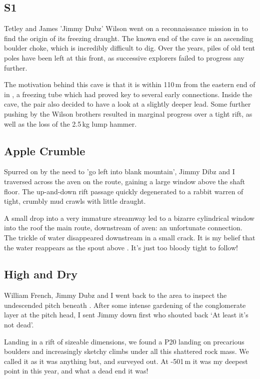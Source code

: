 
\subsection{S1} Tetley and James 'Jimmy Dubz' Wilson went on a reconnaissance mission in  to find the origin of its freezing draught. The known end of the cave is an ascending boulder choke, which is incredibly difficult to dig. Over the years, piles of old tent poles have been left at this front, as successive explorers failed to progress any further. 

The motivation behind this cave is that it is within 110\,m from the eastern end of  in , a freezing tube which had proved key to several early connections. Inside the cave, the pair also decided to have a look at a slightly deeper lead. Some further pushing by the Wilson brothers resulted in marginal progress over a tight rift, as well as the loss of the 2.5\,kg lump hammer. 

\subsection{Apple Crumble} Spurred on by the need to 'go left into blank mountain', Jimmy Dibz and I  traversed across the  aven on the  route, gaining a large window above the shaft floor. The up-and-down rift passage quickly degenerated to a rabbit warren of tight, crumbly mud crawls with little draught. 

A small drop into a very immature streamway led to a bizarre cylindrical window into the roof the main  route, downstream of  aven: an unfortunate connection. The trickle of water disappeared downstream in a small crack. It is my belief that the water reappears as the spout above . It's just too bloody tight to follow! 

\subsection{High and Dry} William French, Jimmy Dubz and I went back to the  area to inspect the undescended pitch beneath . After some intense gardening of the conglomerate layer at the pitch head, I sent Jimmy down first who shouted back `At least it's not dead'. 

Landing in a rift of sizeable dimensions, we found a P20 landing on precarious boulders and increasingly sketchy climbs under all this shattered rock mass. We called it  as it was anything but, and surveyed out. At -501\,m it was my deepest point in  this year, and what a dead end it was! 


